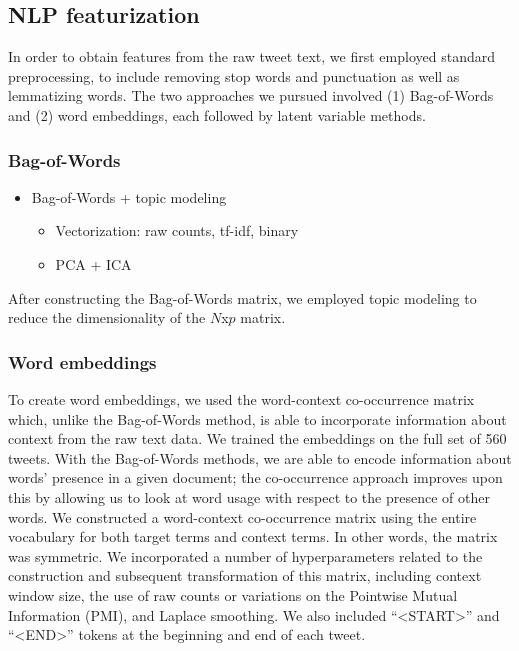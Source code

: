 \documentclass{article}
\begin{document}
\hypertarget{nlp-featurization}{%
\subsection{NLP featurization}\label{nlp-featurization}}

In order to obtain features from the raw tweet text, we first employed
standard preprocessing, to include removing stop words and punctuation
as well as lemmatizing words. The two approaches we pursued involved (1)
Bag-of-Words and (2) word embeddings, each followed by latent variable
methods.

\hypertarget{bag-of-words}{%
\subsubsection{Bag-of-Words}\label{bag-of-words}}

\begin{itemize}
\tightlist
\item
  Bag-of-Words + topic modeling

  \begin{itemize}
  \tightlist
  \item
    Vectorization: raw counts, tf-idf, binary
  \item
    PCA + ICA
  \end{itemize}
\end{itemize}

After constructing the Bag-of-Words matrix, we employed topic modeling
to reduce the dimensionality of the \(N\)x\(p\) matrix.

\hypertarget{word-embeddings}{%
\subsubsection{Word embeddings}\label{word-embeddings}}

To create word embeddings, we used the word-context co-occurrence matrix
which, unlike the Bag-of-Words method, is able to incorporate
information about context from the raw text data. We trained the
embeddings on the full set of 560 tweets. With the Bag-of-Words methods,
we are able to encode information about words' presence in a given
document; the co-occurrence approach improves upon this by allowing us
to look at word usage with respect to the presence of other words. We
constructed a word-context co-occurrence matrix using the entire
vocabulary for both target terms and context terms. In other words, the
matrix was symmetric. We incorporated a number of hyperparameters
related to the construction and subsequent transformation of this
matrix, including context window size, the use of raw counts or
variations on the Pointwise Mutual Information (PMI), and Laplace
smoothing. We also included ``\textless START\textgreater{}'' and
``\textless END\textgreater{}'' tokens at the beginning and end of each
tweet.
\end{document}
